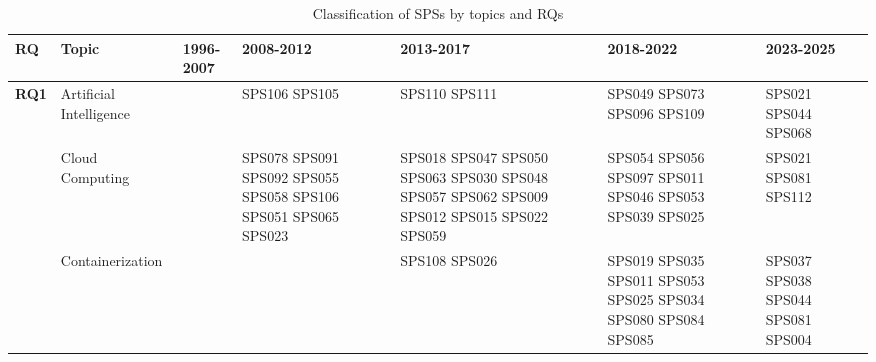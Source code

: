 \begin{table*}[htbp]
	\centering
	\caption{Classification of SPSs by topics and RQs}
	\label{table:sps_classification_by_topic_rq}
	\renewcommand{\arraystretch}{1.2}
	\setlength{\tabcolsep}{6pt}
	\begin{tabularx}{\textwidth}{p{0.8cm}p{2.5cm}>{\raggedright\arraybackslash}X>{\raggedright\arraybackslash}X>{\raggedright\arraybackslash}X>{\raggedright\arraybackslash}X>{\raggedright\arraybackslash}X}
		\toprule
		\textbf{RQ}                           & \textbf{Topic}         & \textbf{1996-2007}                                      & \textbf{2008-2012}                                                                                                            & \textbf{2013-2017}                                                                         & \textbf{2018-2022}                                                                  & \textbf{2023-2025}                 \\
		\midrule
		\multirow{12}{*}[-11em]{\textbf{RQ1}} & Artificial Intelligence &                                                         & SPS106 SPS105                                                                                                                 & SPS110 SPS111                                                                              & SPS049 SPS073 SPS096 SPS109                                                         & SPS021 SPS044 SPS068               \\
		\addlinespace[0.3em]
		                                      & Cloud Computing         &                                                         & SPS078 SPS091 SPS092 SPS055 SPS058 SPS106 SPS051 SPS065 SPS023                                                                & SPS018 SPS047 SPS050 SPS063 SPS030 SPS048 SPS057 SPS062 SPS009 SPS012 SPS015 SPS022 SPS059 & SPS054 SPS056 SPS097 SPS011 SPS046 SPS053 SPS039 SPS025                             & SPS021 SPS081 SPS112               \\
		\addlinespace[0.3em]
		                                      & Containerization        &                                                         &                                                                                                                               & SPS108 SPS026                                                                              & SPS019 SPS035 SPS011 SPS053 SPS025 SPS034 SPS080 SPS084 SPS085                      & SPS037 SPS038 SPS044 SPS081 SPS004 \\

\end{tabularx}
\end{table*}
